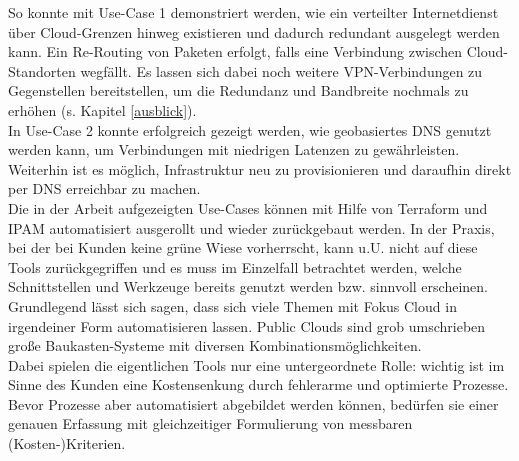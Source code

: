 So konnte mit Use-Case 1 demonstriert werden, wie ein verteilter Internetdienst über Cloud-Grenzen hinweg existieren und dadurch redundant ausgelegt werden kann. Ein Re-Routing von Paketen erfolgt, falls eine Verbindung zwischen Cloud-Standorten wegfällt. Es lassen sich dabei noch weitere VPN-Verbindungen zu Gegenstellen bereitstellen, um die Redundanz und Bandbreite nochmals zu erhöhen (s. Kapitel \ref{ausblick}).\\
In Use-Case 2 konnte erfolgreich gezeigt werden, wie geobasiertes DNS genutzt werden kann, um Verbindungen mit niedrigen Latenzen zu gewährleisten. Weiterhin ist es möglich, Infrastruktur neu zu provisionieren und daraufhin direkt per DNS erreichbar zu machen.\\ 
Die in der Arbeit aufgezeigten Use-Cases können mit Hilfe von Terraform und IPAM automatisiert ausgerollt und wieder zurückgebaut werden. In der Praxis, bei der bei Kunden keine \glqq grüne Wiese\grqq{} vorherrscht, kann u.U. nicht auf diese Tools zurückgegriffen und es muss im Einzelfall betrachtet werden, welche Schnittstellen und Werkzeuge bereits genutzt werden bzw. sinnvoll erscheinen. Grundlegend lässt sich sagen, dass sich viele Themen mit Fokus Cloud in irgendeiner Form automatisieren lassen. Public Clouds sind grob umschrieben große \glqq Baukasten-Systeme\grqq{} mit diversen Kombinationsmöglichkeiten.\\
Dabei spielen die eigentlichen Tools nur eine untergeordnete Rolle: wichtig ist im Sinne des Kunden eine Kostensenkung durch fehlerarme und optimierte Prozesse. Bevor Prozesse aber automatisiert abgebildet werden können, bedürfen sie einer genauen Erfassung mit gleichzeitiger Formulierung von messbaren (Kosten-)Kriterien.%

